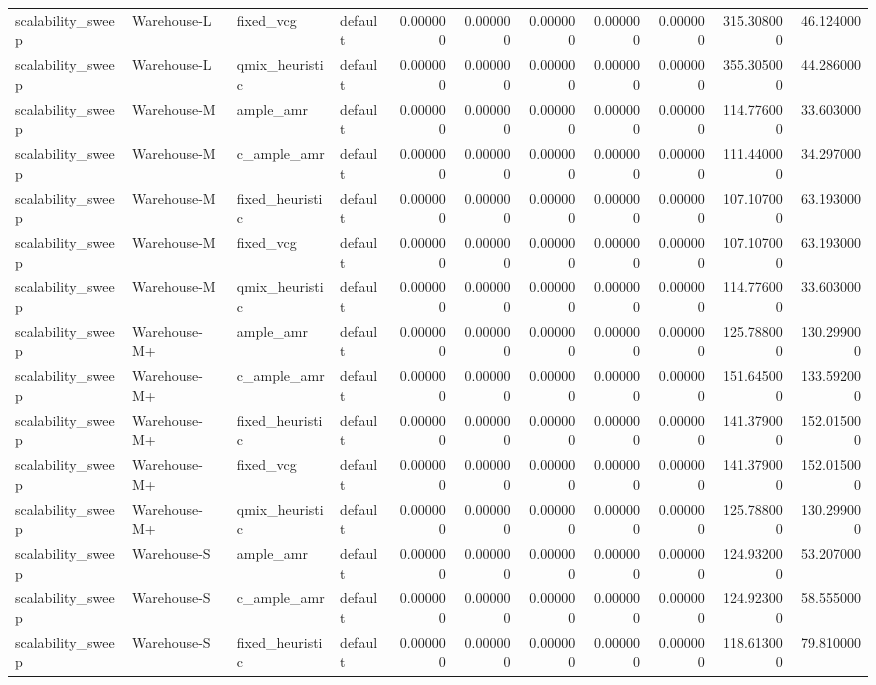 \begin{tabular}{llllrrrrrrr}
scalability_sweep & Warehouse-L & fixed_vcg & default & 0.000000 & 0.000000 & 0.000000 & 0.000000 & 0.000000 & 315.308000 & 46.124000 \\
scalability_sweep & Warehouse-L & qmix_heuristic & default & 0.000000 & 0.000000 & 0.000000 & 0.000000 & 0.000000 & 355.305000 & 44.286000 \\
scalability_sweep & Warehouse-M & ample_amr & default & 0.000000 & 0.000000 & 0.000000 & 0.000000 & 0.000000 & 114.776000 & 33.603000 \\
scalability_sweep & Warehouse-M & c_ample_amr & default & 0.000000 & 0.000000 & 0.000000 & 0.000000 & 0.000000 & 111.440000 & 34.297000 \\
scalability_sweep & Warehouse-M & fixed_heuristic & default & 0.000000 & 0.000000 & 0.000000 & 0.000000 & 0.000000 & 107.107000 & 63.193000 \\
scalability_sweep & Warehouse-M & fixed_vcg & default & 0.000000 & 0.000000 & 0.000000 & 0.000000 & 0.000000 & 107.107000 & 63.193000 \\
scalability_sweep & Warehouse-M & qmix_heuristic & default & 0.000000 & 0.000000 & 0.000000 & 0.000000 & 0.000000 & 114.776000 & 33.603000 \\
scalability_sweep & Warehouse-M+ & ample_amr & default & 0.000000 & 0.000000 & 0.000000 & 0.000000 & 0.000000 & 125.788000 & 130.299000 \\
scalability_sweep & Warehouse-M+ & c_ample_amr & default & 0.000000 & 0.000000 & 0.000000 & 0.000000 & 0.000000 & 151.645000 & 133.592000 \\
scalability_sweep & Warehouse-M+ & fixed_heuristic & default & 0.000000 & 0.000000 & 0.000000 & 0.000000 & 0.000000 & 141.379000 & 152.015000 \\
scalability_sweep & Warehouse-M+ & fixed_vcg & default & 0.000000 & 0.000000 & 0.000000 & 0.000000 & 0.000000 & 141.379000 & 152.015000 \\
scalability_sweep & Warehouse-M+ & qmix_heuristic & default & 0.000000 & 0.000000 & 0.000000 & 0.000000 & 0.000000 & 125.788000 & 130.299000 \\
scalability_sweep & Warehouse-S & ample_amr & default & 0.000000 & 0.000000 & 0.000000 & 0.000000 & 0.000000 & 124.932000 & 53.207000 \\
scalability_sweep & Warehouse-S & c_ample_amr & default & 0.000000 & 0.000000 & 0.000000 & 0.000000 & 0.000000 & 124.923000 & 58.555000 \\
scalability_sweep & Warehouse-S & fixed_heuristic & default & 0.000000 & 0.000000 & 0.000000 & 0.000000 & 0.000000 & 118.613000 & 79.810000 \\

\end{tabular}
